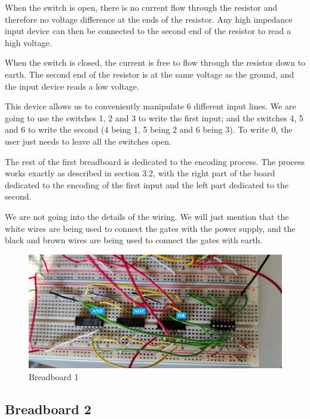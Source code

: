 \documentclass{article}
\begin{document}
When the switch is open, there is no current flow through the resistor and therefore no voltage difference at the ends of the resistor. Any high impedance input device can then be connected to the second end of the resistor to read a high voltage.

When the switch is closed, the current is free to flow through the resistor down to earth. The second end of the resistor is at the same voltage as the ground, and the input device reads a low voltage.

\vspace{5mm}

This device allows us to conveniently manipulate 6 different input lines. We are going to use the switches 1, 2 and 3 to write the first input; and the switches 4, 5 and 6 to write the second (4 being 1, 5 being 2 and 6 being 3). To write 0, the user just needs to leave all the switches open.

\vspace{5mm}

The rest of the first breadboard is dedicated to the encoding process. The process works exactly as described in section 3.2, with the right part of the board dedicated to the encoding of the first input and the left part dedicated to the second.

We are not going into the details of the wiring. We will just mention that the white wires are being used to connect the gates with the power supply, and the black and brown wires are being used to connect the gates with earth.

\begin{figure}[h]
  \centering
  \includegraphics[width=\linewidth]{breadboard1}
  \caption{Breadboard 1}
  \label{breadboard1}
\end{figure}

\subsection{Breadboard 2}
\end{document}
